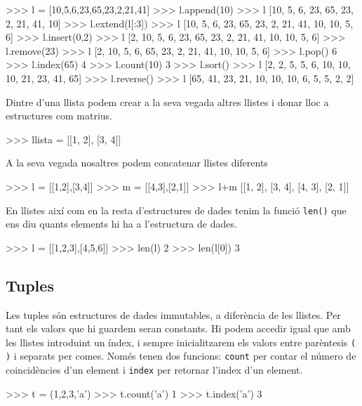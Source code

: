 \begin{tip}[caption=Operacions amb llistes]
>>> l = [10,5,6,23,65,23,2,21,41]
>>> l.append(10)
>>> l
[10, 5, 6, 23, 65, 23, 2, 21, 41, 10]
>>> l.extend(l[:3])
>>> l
[10, 5, 6, 23, 65, 23, 2, 21, 41, 10, 10, 5, 6]
>>> l.insert(0,2)
>>> l
[2, 10, 5, 6, 23, 65, 23, 2, 21, 41, 10, 10, 5, 6]
>>> l.remove(23)
>>> l
[2, 10, 5, 6, 65, 23, 2, 21, 41, 10, 10, 5, 6]
>>> l.pop()
6
>>> l.index(65)
4
>>> l.count(10)
3
>>> l.sort()
>>> l
[2, 2, 5, 5, 6, 10, 10, 10, 21, 23, 41, 65]
>>> l.reverse()
>>> l
[65, 41, 23, 21, 10, 10, 10, 6, 5, 5, 2, 2]
\end{tip}

Dintre d'una llista podem crear a la seva vegada altres llistes i donar lloc a estructures com matrius.

\begin{blockcode}
>>> llista = [[1, 2], [3, 4]]
\end{blockcode}


A la seva vegada nosaltres podem concatenar llistes diferents

\begin{blockcode}
>>> l = [[1,2],[3,4]]
>>> m = [[4,3],[2,1]]
>>> l+m
[[1, 2], [3, 4], [4, 3], [2, 1]]
\end{blockcode}

En llistes així com en la resta d'estructures de dades tenim la funció {\tt len()} que ens diu quants elements hi ha a l'estructura de dades.

\begin{blockcode}
>>> l = [[1,2,3],[4,5,6]]
>>> len(l)
2
>>> len(l[0])
3
\end{blockcode}

\subsection{Tuples}

Les tuples són estructures de dades immutables, a diferència de les llistes. Per tant els valors que hi guardem seran constants. Hi podem accedir igual que amb les llistes introduint un índex, i sempre inicialitzarem els valors entre parèntesis {\tt ( )} i separats per comes. Només tenen dos funcions: {\tt count} per contar el número de coincidències d'un element i {\tt index} per retornar l'index d'un element.

\begin{tip}[caption=Operacions amb tuples]
>>> t = (1,2,3,'a')
>>> t.count('a')
1
>>> t.index('a')
3
\end{tip}



